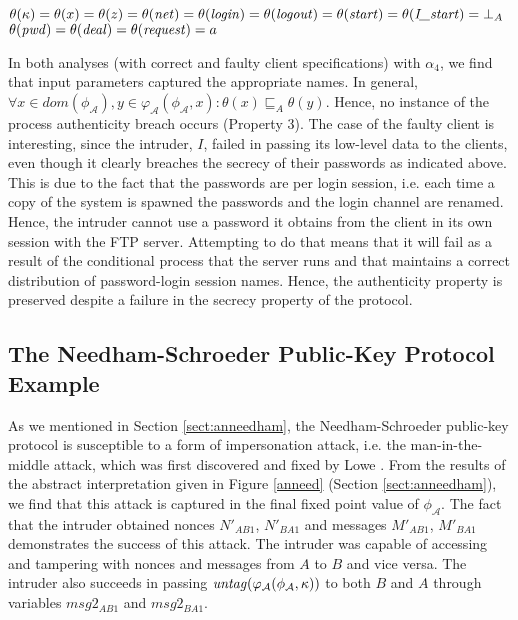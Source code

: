 \documentclass[10pt,a4paper,final,oneside,fleqn]{book}
\begin{document}
\noindent
$\theta(\kappa)=\theta(x)=\theta(z)=\theta(\mbox{{\itshape net\/}})=\theta(\mbox{{\itshape login\/}})=\theta(\mbox{{\itshape logout\/}})=\theta(\mbox{{\itshape start\/}})=\theta(\mbox{{\itshape I\_start\/}})=\bot_A$\\
$\theta(\mbox{{\itshape pwd\/}})=\theta(\mbox{{\itshape deal\/}})=\theta(\mbox{{\itshape request\/}})=a$\vspace{5mm}

\noindent
In both analyses (with correct and faulty client specifications) with $\alpha_4$, we find that input parameters captured the appropriate names.  In general, $\forall x\in dom(\phi_\mathcal{A}),y\in\varphi_\mathcal{A}(\phi_\mathcal{A},x):\theta(x)\sqsubseteq_A\theta(y)$.  Hence, no instance of the process authenticity breach occurs (Property 3).  The case of the faulty client is interesting, since the intruder, $I$, failed in passing its low-level data to the clients, even though it clearly breaches the secrecy of their passwords as indicated above.  This is due to the fact that the passwords are per login session, i.e. each time a copy of the system is spawned the passwords and the login channel are renamed.  Hence, the intruder cannot use a password it obtains from the client in its own session with the FTP server.  Attempting to do that means that it will fail as a result of the conditional process that the server runs and that maintains a correct distribution of password-login session names.  Hence, the authenticity property is preserved despite a failure in the secrecy property of the protocol.
\subsection{The Needham-Schroeder Public-Key Protocol Example}
As we mentioned in Section \ref{sect:anneedham}, the Needham-Schroeder public-key protocol is susceptible to a form of impersonation attack, i.e. the man-in-the-middle attack, which was first discovered and fixed by Lowe \cite{lowe1}.  From the results of the abstract interpretation given in Figure \ref{anneed} (Section \ref{sect:anneedham}), we find that this attack is captured in the final fixed point value of $\phi_\mathcal{A}$.  The fact that the intruder obtained nonces $N'_{AB1}$, $N'_{BA1}$ and messages $M'_{AB1}$, $M'_{BA1}$ demonstrates the success of this attack.  The intruder was capable of accessing and tampering with nonces and messages from $A$ to $B$ and vice versa.  The intruder also succeeds in passing $\mbox{{\itshape untag\/}}(\varphi_\mathcal{A}(\phi_\mathcal{A},\kappa))$ to both $B$ and $A$ through variables $msg2_{AB1}$ and $msg2_{BA1}$.
\end{document}
